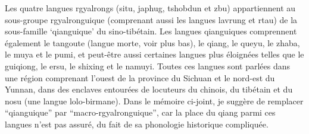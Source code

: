 \documentclass[oldfontcommands,oneside,a4paper,11pt]{memoir}
\begin{document}
Les quatre langues rgyalrongs (situ, japhug, tshobdun et zbu) appartiennent au sous-groupe rgyalronguique (comprenant aussi les langues lavrung et rtau) de la sous-famille `qianguique' du sino-tibétain. Les langues qianguiques comprennent également le tangoute (langue morte, voir plus bas), le qiang, le queyu, le zhaba, le muya et le pumi, et peut-être aussi certaines langues plus éloignées telles que le guiqiong, le ersu, le shixing et le namuyi. Toutes ces langues sont parlées dans une région comprenant l’ouest de la province du Sichuan et le nord-est du Yunnan, dans des enclaves entourées de locuteurs du chinois, du tibétain et du nosu (une langue lolo-birmane). Dans le mémoire ci-joint, je suggère de remplacer ``qianguique'' par ``macro-rgyalronguique'', car la place du qiang parmi ces langues n'est pas assuré, du fait de sa phonologie historique compliquée.
\end{document}
